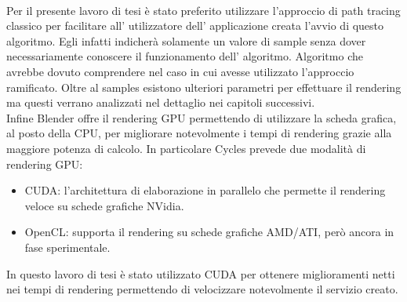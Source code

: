 \\
Per il presente lavoro di tesi è stato preferito utilizzare l’approccio di path tracing classico per facilitare all’ utilizzatore dell’ applicazione creata l’avvio di questo algoritmo. Egli infatti indicherà solamente un valore di sample senza dover necessariamente conoscere il funzionamento dell’ algoritmo. Algoritmo che avrebbe dovuto comprendere nel caso in cui avesse utilizzato l’approccio ramificato.
Oltre al samples esistono ulteriori parametri per effettuare il rendering ma questi verrano analizzati nel dettaglio nei capitoli successivi.
\\
Infine Blender offre il rendering GPU permettendo di utilizzare la scheda grafica, al posto della CPU, per migliorare notevolmente i tempi di rendering grazie alla maggiore potenza di calcolo.
In particolare Cycles prevede due modalità di rendering GPU:
\begin{itemize}
\item CUDA: l'architettura di elaborazione in parallelo che permette il rendering veloce su schede grafiche NVidia.
\item OpenCL: supporta il rendering su schede grafiche AMD/ATI, però ancora in fase sperimentale.
\end{itemize}
In questo lavoro di tesi è stato utilizzato CUDA per ottenere miglioramenti netti nei tempi di rendering permettendo di velocizzare notevolmente il servizio creato.